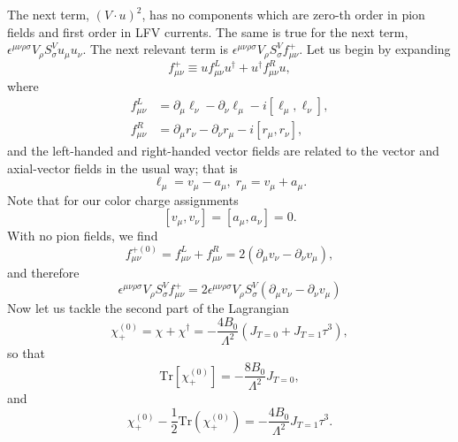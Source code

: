 \documentclass{book}[12pt]
\begin{document}
The next term, $(V\cdot u)^2$, has no components which are zero-th order in pion fields and first order in LFV currents. The same is true for the next term, $\epsilon^{\mu\nu\rho\sigma}V_{\rho}S^V_{\sigma}u_{\mu}u_{\nu}$. The next relevant term is $\epsilon^{\mu\nu\rho\sigma}V_{\rho}S^V_{\sigma}f^+_{\mu\nu}$. Let us begin by expanding
\begin{equation}
f_{\mu\nu}^+\equiv u f_{\mu\nu}^L u^{\dag}+u^{\dag}f^R_{\mu\nu}u,
\end{equation}
where
\begin{equation}
\begin{split}
f_{\mu\nu}^L&=\partial_{\mu}\ell_{\nu}-\partial_{\nu}\ell_{\mu}-i\left[\ell_{\mu},\ell_{\nu}\right],\\
f_{\mu\nu}^R&=\partial_{\mu}r_{\nu}-\partial_{\nu}r_{\mu}-i\left[r_{\mu},r_{\nu}\right],
\end{split}
\end{equation}
and the left-handed and right-handed vector fields are related to the vector and axial-vector fields in the usual way; that is
\begin{equation}
\ell_{\mu}=v_{\mu}-a_{\mu},\;r_{\mu}=v_{\mu}+a_{\mu}.
\end{equation}
Note that for our color charge assignments
\begin{equation}
\left[v_{\mu},v_{\nu}\right]=\left[a_{\mu},a_{\nu}\right]=0.
\end{equation}
With no pion fields, we find
\begin{equation}
f^{+(0)}_{\mu\nu}=f^L_{\mu\nu}+f^R_{\mu\nu}=2\left(\partial_{\mu}v_{\nu}-\partial_{\nu}v_{\mu}\right),
\end{equation}
and therefore
\begin{equation}
\epsilon^{\mu\nu\rho\sigma}V_{\rho}S^V_{\sigma}f^+_{\mu\nu}=2\epsilon^{\mu\nu\rho\sigma}V_{\rho}S^V_{\sigma}\left(\partial_{\mu}v_{\nu}-\partial_{\nu}v_{\mu}\right)
\end{equation}
Now let us tackle the second part of the Lagrangian 
\begin{equation}
\chi_+^{(0)}=\chi+\chi^{\dag}=-\frac{4B_0}{\Lambda^2}\left(J_{T=0}+J_{T=1}\tau^3\right),
\end{equation}
so that
\begin{equation}
\mathrm{Tr}\left[\chi^{(0)}_+\right]=-\frac{8B_0}{\Lambda^2}J_{T=0},
\end{equation}
and
\begin{equation}
\chi^{(0)}_+-\frac{1}{2}\mathrm{Tr}\left(\chi^{(0)}_+\right)=-\frac{4B_0}{\Lambda^2}J_{T=1}\tau^3.
\end{equation}
\end{document}
